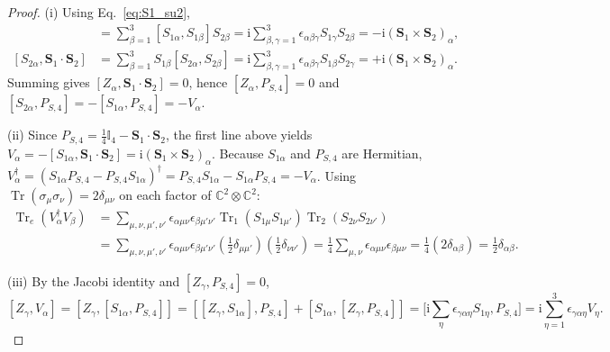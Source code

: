 \documentclass[onecolumn,10pt,notitlepage,amsmath,amssymb,floatfix]{revtex4-2}
\theoremstyle{plain}
\theoremstyle{definition}
\newcommand{\ii}{\mathrm{i}}
\newcommand{\Tr}{\operatorname{Tr}}
\begin{document}
\begin{proof}
(i) Using Eq.~\eqref{eq:S1_su2},
\begin{align*}
[S_{1\alpha}, \mathbf{S}_1 \cdot \mathbf{S}_2]
&= \sum_{\beta=1}^3 [S_{1\alpha}, S_{1\beta}] S_{2\beta}
= \ii \sum_{\beta,\gamma=1}^3 \epsilon_{\alpha\beta\gamma} S_{1\gamma} S_{2\beta}
= -\ii(\mathbf{S}_1 \times \mathbf{S}_2)_\alpha, \\
[S_{2\alpha}, \mathbf{S}_1 \cdot \mathbf{S}_2]
&= \sum_{\beta=1}^3 S_{1\beta} [S_{2\alpha}, S_{2\beta}]
= \ii \sum_{\beta,\gamma=1}^3 \epsilon_{\alpha\beta\gamma} S_{1\beta} S_{2\gamma}
= +\ii(\mathbf{S}_1 \times \mathbf{S}_2)_\alpha.
\end{align*}
Summing gives $[Z_\alpha, \mathbf{S}_1\cdot\mathbf{S}_2] = 0$, hence $[Z_\alpha, P_{S,4}] = 0$ and $[S_{2\alpha}, P_{S,4}] = -[S_{1\alpha}, P_{S,4}] = -V_\alpha$.

(ii) Since $P_{S,4} = \frac{1}{4}\mathbb{I}_4 - \mathbf{S}_1\cdot\mathbf{S}_2$, the first line above yields $V_\alpha = -[S_{1\alpha}, \mathbf{S}_1\cdot\mathbf{S}_2] = \ii(\mathbf{S}_1\times\mathbf{S}_2)_\alpha$. Because $S_{1\alpha}$ and $P_{S,4}$ are Hermitian, $V_\alpha^\dagger = (S_{1\alpha}P_{S,4} - P_{S,4}S_{1\alpha})^\dagger = P_{S,4}S_{1\alpha} - S_{1\alpha}P_{S,4} = -V_\alpha$. Using $\Tr(\sigma_\mu \sigma_\nu) = 2\delta_{\mu\nu}$ on each factor of $\mathbb{C}^2 \otimes \mathbb{C}^2$:
\begin{align*}
\Tr_e(V_\alpha^\dagger V_\beta)
&= \sum_{\mu,\nu,\mu',\nu'} \epsilon_{\alpha\mu\nu}\epsilon_{\beta\mu'\nu'} \Tr_1(S_{1\mu}S_{1\mu'})\Tr_2(S_{2\nu}S_{2\nu'}) \\
&= \sum_{\mu,\nu,\mu',\nu'} \epsilon_{\alpha\mu\nu}\epsilon_{\beta\mu'\nu'} \left(\frac{1}{2}\delta_{\mu\mu'}\right)\left(\frac{1}{2}\delta_{\nu\nu'}\right)
= \frac{1}{4}\sum_{\mu,\nu}\epsilon_{\alpha\mu\nu}\epsilon_{\beta\mu\nu}
= \frac{1}{4}(2\delta_{\alpha\beta}) = \frac{1}{2}\delta_{\alpha\beta}.
\end{align*}

(iii) By the Jacobi identity and $[Z_\gamma, P_{S,4}] = 0$,
\[
[Z_\gamma, V_\alpha] = [Z_\gamma, [S_{1\alpha}, P_{S,4}]]
= [[Z_\gamma, S_{1\alpha}], P_{S,4}] + [S_{1\alpha}, [Z_\gamma, P_{S,4}]]
= \Big[\ii\sum_\eta \epsilon_{\gamma\alpha\eta} S_{1\eta}, P_{S,4}\Big]
= \ii\sum_{\eta=1}^3 \epsilon_{\gamma\alpha\eta} V_\eta.
\]


\end{proof}
\end{document}
